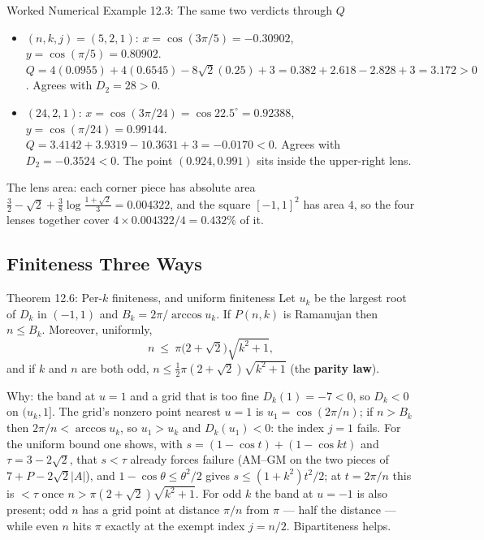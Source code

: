 \documentclass[11pt]{article}
\begin{document}
\begin{callbox}{Worked Numerical Example 12.3: The same two verdicts through $Q$}
\begin{itemize}[leftmargin=*,nosep]
  \item $(n,k,j)=(5,2,1)$: $x=\cos(3\pi/5)=-0.30902$, $y=\cos(\pi/5)=0.80902$. $Q=4(0.0955)+4(0.6545)-8\sqrt2(0.25)+3=0.382+2.618-2.828+3=3.172>0$. Agrees with $D_2=28>0$.
  \item $(24,2,1)$: $x=\cos(3\pi/24)=\cos22.5^\circ=0.92388$, $y=\cos(\pi/24)=0.99144$. $Q=3.4142+3.9319-10.3631+3=-0.0170<0$. Agrees with $D_2=-0.3524<0$. The point $(0.924,0.991)$ sits inside the upper-right lens.
\end{itemize}
The lens area: each corner piece has absolute area $\tfrac32-\sqrt2+\tfrac38\log\frac{1+\sqrt2}{3}=0.004322$, and the square $[-1,1]^2$ has area $4$, so the four lenses together cover $4\times0.004322/4=0.432\%$ of it.
\end{callbox}

\subsection{Finiteness Three Ways}

\begin{thmbox}{Theorem 12.6: Per-$k$ finiteness, and uniform finiteness}
Let $u_k$ be the largest root of $D_k$ in $(-1,1)$ and $B_k=2\pi/\arccos u_k$. If $P(n,k)$ is Ramanujan then $n\le B_k$. Moreover, uniformly,
\begin{equation}
  n\ \le\ \pi\bigl(2+\sqrt2\bigr)\sqrt{k^2+1},
\end{equation}
and if $k$ and $n$ are both odd, $n\le\tfrac12\pi(2+\sqrt2)\sqrt{k^2+1}$ (the \textbf{parity law}).
\end{thmbox}

\begin{defbox}{Why: the band at $u=1$ and a grid that is too fine}
$D_k(1)=-7<0$, so $D_k<0$ on $(u_k,1]$. The grid's nonzero point nearest $u=1$ is $u_1=\cos(2\pi/n)$; if $n>B_k$ then $2\pi/n<\arccos u_k$, so $u_1>u_k$ and $D_k(u_1)<0$: the index $j=1$ fails. For the uniform bound one shows, with $s=(1-\cos t)+(1-\cos kt)$ and $\tau=3-2\sqrt2$, that $s<\tau$ already forces failure (AM--GM on the two pieces of $7+P-2\sqrt2|A|$), and $1-\cos\theta\le\theta^2/2$ gives $s\le(1+k^2)t^2/2$; at $t=2\pi/n$ this is $<\tau$ once $n>\pi(2+\sqrt2)\sqrt{k^2+1}$. For odd $k$ the band at $u=-1$ is also present; odd $n$ has a grid point at distance $\pi/n$ from $\pi$ --- half the distance --- while even $n$ hits $\pi$ exactly at the exempt index $j=n/2$. Bipartiteness helps.
\end{defbox}
\end{document}
